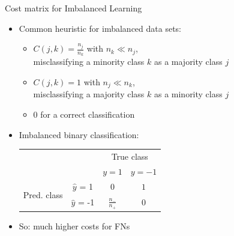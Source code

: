 \documentclass[10pt,compress,t,notes=noshow, xcolor=table]{beamer}
\begin{document}
\begin{frame}{Cost matrix for Imbalanced Learning}
		\begin{itemize}			
	 
			\item Common heuristic for imbalanced data sets: 
	
			\begin{itemize}
                \item $C(j,k) = \frac{n_j}{n_k}$ with $n_k  \ll n_j$,\\
                misclassifying a minority class $k$ as a majority class $j$
		
				\item $C(j,k) = 1$ with $n_j \ll n_k$,\\
    misclassifying a majority class $k$ as a minority class $j$
			
				\item 0 for a correct classification 
			
			\end{itemize}
\vspace{1cm}
    		\item Imbalanced binary classification: \\
            \begin{table}[]
                \centering
                \begin{tabular}{cc|cc}
                    & &\multicolumn{2}{c}{True class} \\
                    & & $y=1$ & $y=-1$  \\
                    \hline
                    \multirow{2}{*}{\parbox{0.5cm}{Pred. class}}& $\hat y$ = 1     & $0$                & $ 1 $\\
                    & $\hat y$ = -1 & $ \frac{n_-}{n_+} $              &  $0$   \\
                \end{tabular}
            \end{table}
    		

            \item So: much higher costs for FNs
        \end{itemize}
		
\end{frame}
\end{document}
